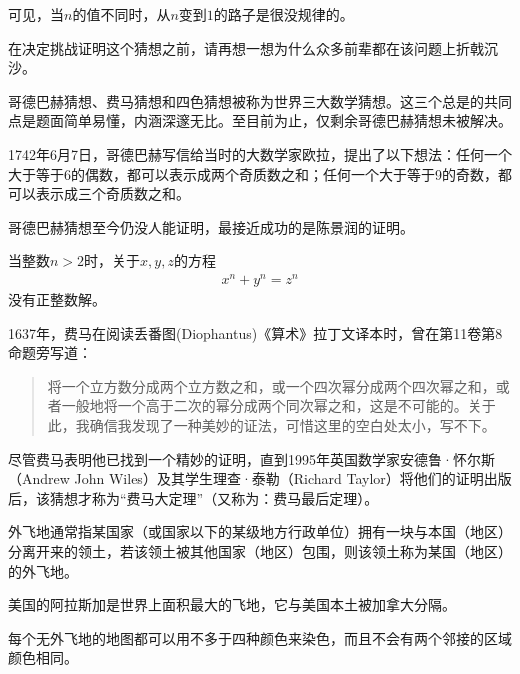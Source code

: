 可见，当$n$的值不同时，从$n$变到$1$的路子是很没规律的。

在决定挑战证明这个猜想之前，请再想一想为什么众多前辈都在该问题上折戟沉沙。


哥德巴赫猜想、费马猜想和四色猜想被称为世界三大数学猜想。这三个总是的共同点是题面简单易懂，内涵深邃无比。至目前为止，仅剩余哥德巴赫猜想未被解决。

\begin{example}\label{ex:Goldbach-conjecture}
  1742年6月7日，哥德巴赫写信给当时的大数学家欧拉，提出了以下想法：任何一个大于等于6的偶数，都可以表示成两个奇质数之和；任何一个大于等于9的奇数，都可以表示成三个奇质数之和。
\end{example}

哥德巴赫猜想至今仍没人能证明，最接近成功的是陈景润的证明。

\begin{example}
  当整数$n>2$时，关于$x,y,z$的方程
  \begin{align*}
    x^n+y^n=z^n
  \end{align*}
  没有正整数解。
\end{example}
1637年，费马在阅读丢番图(Diophantus)《算术》拉丁文译本时，曾在第11卷第8命题旁写道：

\begin{quotation}
  将一个立方数分成两个立方数之和，或一个四次幂分成两个四次幂之和，或者一般地将一个高于二次的幂分成两个同次幂之和，这是不可能的。关于此，我确信我发现了一种美妙的证法，可惜这里的空白处太小，写不下。
\end{quotation}

尽管费马表明他已找到一个精妙的证明，直到1995年英国数学家安德鲁·怀尔斯（Andrew John Wiles）及其学生理查·泰勒（Richard Taylor）将他们的证明出版后，该猜想才称为“费马大定理”（又称为：费马最后定理）。


\begin{definition}
  外飞地通常指某国家（或国家以下的某级地方行政单位）拥有一块与本国（地区）分离开来的领土，若该领土被其他国家（地区）包围，则该领土称为某国（地区）的外飞地。
\end{definition}

美国的阿拉斯加是世界上面积最大的飞地，它与美国本土被加拿大分隔。

\begin{example}
  每个无外飞地的地图都可以用不多于四种颜色来染色，而且不会有两个邻接的区域颜色相同。
\end{example}

